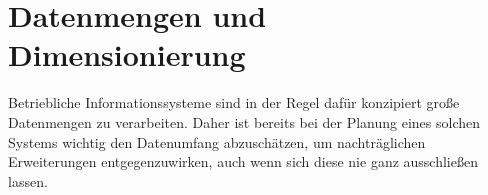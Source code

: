 \section{Datenmengen und Dimensionierung}

Betriebliche Informationssysteme sind in der Regel dafür konzipiert große Datenmengen zu verarbeiten. Daher ist bereits bei der Planung eines solchen Systems wichtig den Datenumfang abzuschätzen, um nachträglichen Erweiterungen entgegenzuwirken, auch wenn sich diese nie ganz ausschließen lassen.


